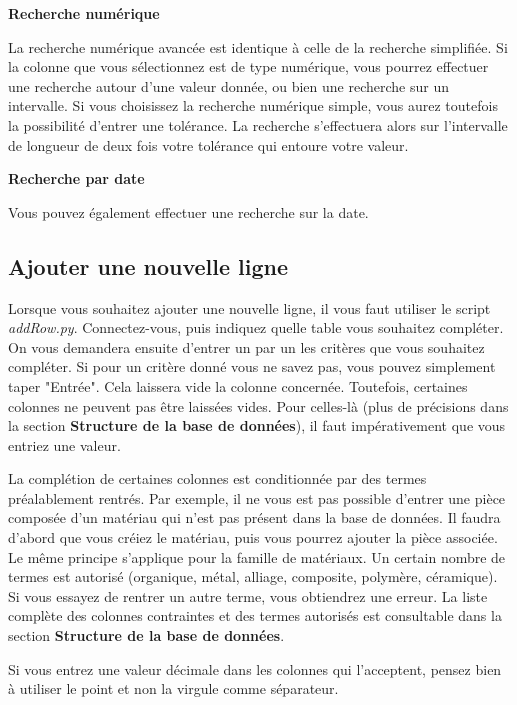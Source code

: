 \documentclass[12pt,a4paper]{article}
\begin{document}
        \medskip
        \textbf{Recherche numérique}
        
        La recherche numérique avancée est identique à celle de la recherche simplifiée.
        Si la colonne que vous sélectionnez est de type numérique, vous pourrez effectuer une recherche autour d'une valeur donnée,
        ou bien une recherche sur un intervalle. Si vous choisissez la recherche numérique simple, vous aurez toutefois
        la possibilité d'entrer une tolérance. La recherche s'effectuera alors sur l'intervalle de longueur de deux fois votre tolérance
        qui entoure votre valeur.

        \medskip
        \textbf{Recherche par date}
        
        Vous pouvez également effectuer une recherche sur la date.


\bigskip
\subsection{Ajouter une nouvelle ligne}

    Lorsque vous souhaitez ajouter une nouvelle ligne, il vous faut utiliser le script \emph{addRow.py}.
    Connectez-vous, puis indiquez quelle table vous souhaitez compléter.
    On vous demandera ensuite d'entrer un par un les critères que vous souhaitez compléter.
    Si pour un critère donné vous ne savez pas, vous pouvez simplement taper "Entrée".
    Cela laissera vide la colonne concernée.
    Toutefois, certaines colonnes ne peuvent pas être laissées vides. Pour celles-là (plus de précisions dans
    la section \textbf{Structure de la base de données}), il faut impérativement que vous entriez une valeur.

    La complétion de certaines colonnes est conditionnée par des termes préalablement rentrés. Par exemple,
    il ne vous est pas possible d'entrer une pièce composée d'un matériau qui n'est pas présent dans la base
    de données. Il faudra d'abord que vous créiez le matériau, puis vous pourrez ajouter la pièce associée.
    Le même principe s'applique pour la famille de matériaux. Un certain nombre de termes est autorisé (organique,
    métal, alliage, composite, polymère, céramique). Si vous essayez de rentrer un autre terme, vous obtiendrez une
    erreur. La liste complète des colonnes contraintes et des termes autorisés est consultable dans la section
    \textbf{Structure de la base de données}.

    Si vous entrez une valeur décimale dans les colonnes qui l'acceptent, pensez bien à utiliser le point et non la
    virgule comme séparateur.
\end{document}
